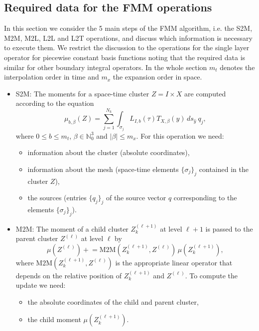 \documentclass[a4paper,11pt]{article}
\theoremstyle{plain}
\theoremstyle{definition}
\theoremstyle{remark}
\newcommand{\pluseq}{\mathrel{+}=}
\begin{document}
\newpage

\subsection{Required data for the FMM operations}
In this section we consider the 5 main steps of the FMM algorithm, i.e. the S2M, M2M, M2L, L2L and L2T operations, and
discuss which information is necessary to execute them. We restrict the discussion to the operations for the single
layer operator for piecewise constant basis functions noting that the required data is similar for other boundary 
integral operators. In the whole section $m_t$ denotes the interpolation order in time and $m_x$ the expansion order in 
space.
\begin{itemize}
  \item S2M: The moments for a space-time cluster $Z = I \times X$ are computed according to the equation 
    \begin{equation*}
      \mu_{b,\beta}(Z) = \sum_{j=1}^{N_k} \int_{\sigma_j} L_{I,b}(\tau) T_{X,\beta}(y) \,ds_{\hat{y}}\ q_j, 
    \end{equation*}
    where $0 \leq b \leq m_t$, $\beta \in \mathbb{N}^3_0$ and $|\beta|\leq m_x$. For this operation we need:
    \begin{itemize}
      \item information about the cluster (absolute coordinates),
      \item information about the mesh (space-time elements $\{\sigma_j\}_j$ contained in the cluster $Z$),
      \item the sources (entries $\{q_j\}_j$ of the source vector $q$ corresponding to the elements $\{\sigma_j\}_j$).
    \end{itemize}
  \item M2M: The moment of a child cluster $Z_{k}^{(\ell+1)}$ at level $\ell+1$ is passed to the parent cluster 
    $Z^{(\ell)}$ at level $\ell$ by
    \begin{equation*}
      \mu(Z^{(\ell)}) \pluseq \mathrm{M2M}(Z_{k}^{(\ell+1)},Z^{(\ell)})\, \mu(Z_{k}^{(\ell+1)}),
    \end{equation*}
    where $\mathrm{M2M}(Z_{k}^{(\ell+1)},Z^{(\ell)})$ is the appropriate linear operator that depends on the relative position of $Z_{k}^{(\ell+1)}$ and $Z^{(\ell)}$. To compute the update we need:
    \begin{itemize}
      \item the absolute coordinates of the child and parent cluster,
      \item the child moment $\mu(Z_{k}^{(\ell+1)})$.

\end{itemize}
\end{itemize}
\end{document}
